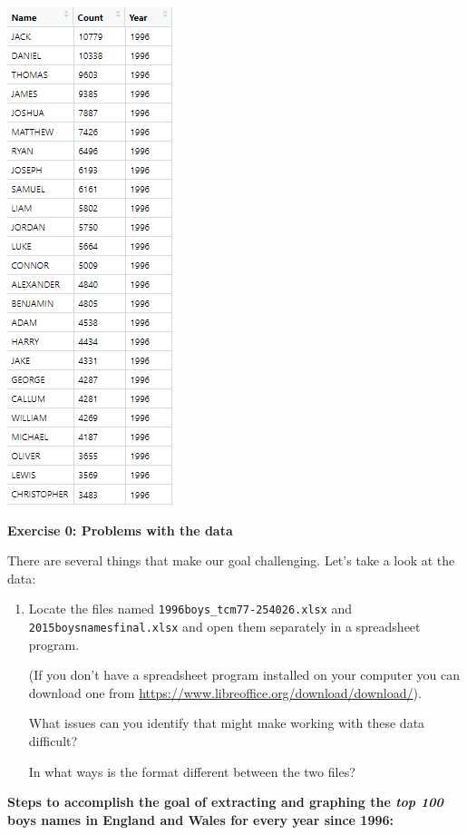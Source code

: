 \documentclass[
]{book}
\begin{document}
\includegraphics{R/RDataWrangling/images/goal.png}

\textbf{Exercise 0: Problems with the data}

There are several things that make our goal challenging. Let's take a look at the data:

\begin{enumerate}
\def\labelenumi{\arabic{enumi}.}
\item
  Locate the files named \texttt{1996boys\_tcm77-254026.xlsx} and
  \texttt{2015boysnamesfinal.xlsx} and open them separately in a
  spreadsheet program.

  (If you don't have a spreadsheet program installed on
  your computer you can download one from
  \url{https://www.libreoffice.org/download/download/}).

  What issues can you identify that might make working
  with these data difficult?

  In what ways is the format different between the two files?
\end{enumerate}

\textbf{Steps to accomplish the goal of extracting and graphing the \emph{top 100} boys names in England and Wales for every year since 1996:}
\end{document}
